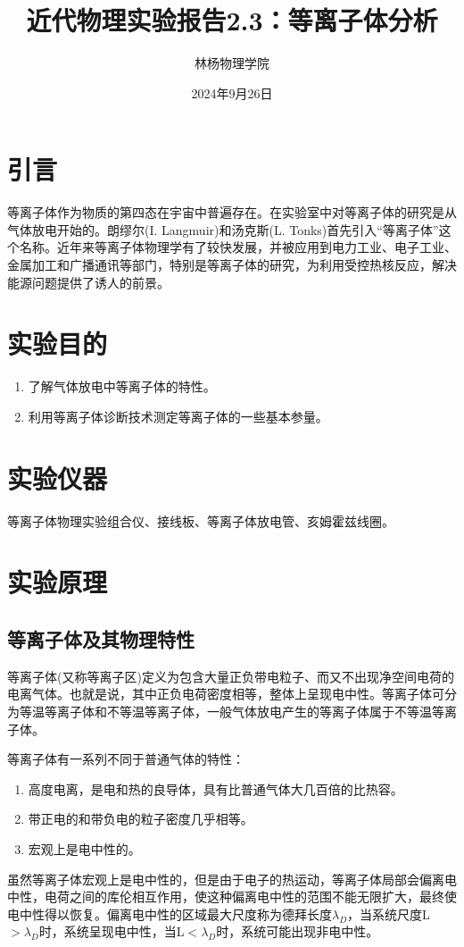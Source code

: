\documentclass[a4paper]{article}
\title{近代物理实验报告2.3：等离子体分析}
\author{林杨\quad 211840092\quad 物理学院}
\date{2024年9月26日}
\begin{document}
\maketitle


\section{引言}
等离子体作为物质的第四态在宇宙中普遍存在。在实验室中对等离子体的研究是从气体放电开始的。朗缪尔(I. Langmuir)和汤克斯(L. Tonks)首先引入“等离子体”这个名称。近年来等离子体物理学有了较快发展，并被应用到电力工业、电子工业、金属加工和广播通讯等部门，特别是等离子体的研究，为利用受控热核反应，解决能源问题提供了诱人的前景。

\section{实验目的}
\begin{enumerate}
\item 了解气体放电中等离子体的特性。
\item 利用等离子体诊断技术测定等离子体的一些基本参量。
\end{enumerate}

\section{实验仪器}
等离子体物理实验组合仪、接线板、等离子体放电管、亥姆霍兹线圈。

\section{实验原理}
\subsection{等离子体及其物理特性}
等离子体(又称等离子区)定义为包含大量正负带电粒子、而又不出现净空间电荷的电离气体。也就是说，其中正负电荷密度相等，整体上呈现电中性。等离子体可分为等温等离子体和不等温等离子体，一般气体放电产生的等离子体属于不等温等离子体。

等离子体有一系列不同于普通气体的特性：
\begin{enumerate}
\item 高度电离，是电和热的良导体，具有比普通气体大几百倍的比热容。
\item 带正电的和带负电的粒子密度几乎相等。
\item 宏观上是电中性的。
\end{enumerate}
虽然等离子体宏观上是电中性的，但是由于电子的热运动，等离子体局部会偏离电中性，电荷之间的库伦相互作用，使这种偏离电中性的范围不能无限扩大，最终使电中性得以恢复。偏离电中性的区域最大尺度称为德拜长度$\lambda_D$，当系统尺度L$>\lambda_D$时，系统呈现电中性，当L$<\lambda_D$时，系统可能出现非电中性。
\end{document}
